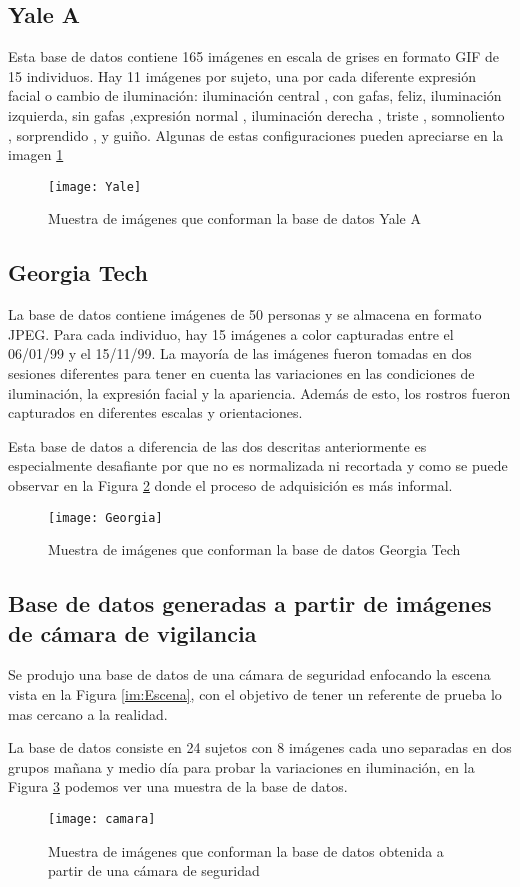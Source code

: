 \subsection{Yale A}
Esta base de datos\cite{Yale} contiene 165 imágenes en escala de grises en formato GIF de 15 individuos. Hay 11 imágenes por sujeto, una por cada diferente expresión facial o cambio de iluminación: iluminación central , con gafas, feliz, iluminación izquierda, sin gafas ,expresión normal , iluminación derecha , triste , somnoliento , sorprendido , y guiño. Algunas de estas configuraciones pueden apreciarse en la imagen \ref{Yale}
\begin{figure}[h]
	\center
	\texttt{[image: Yale]}
    \caption{Muestra de imágenes que conforman la base de datos Yale A}
    \label{Yale}
\end{figure}
\subsection{Georgia Tech}
La base de datos\cite{Georgia} contiene imágenes de 50 personas y se almacena en formato JPEG. Para cada individuo, hay 15 imágenes a color capturadas entre el 06/01/99 y el 15/11/99. La mayoría de las imágenes fueron tomadas en dos sesiones diferentes para tener en cuenta las variaciones en las condiciones de iluminación, la expresión facial y la apariencia. Además de esto, los rostros fueron capturados en diferentes escalas y orientaciones.

Esta base de datos a diferencia de las dos descritas anteriormente es especialmente desafiante por que no es normalizada ni recortada y como se puede observar en la Figura \ref{Georgia} donde el proceso de adquisición es más informal.
\begin{figure}[h]
	\centering
	\texttt{[image: Georgia]}
    \caption{Muestra de imágenes que conforman la base de datos Georgia Tech}
    \label{Georgia}
\end{figure}
\subsection{Base de datos generadas a partir de imágenes de cámara de vigilancia}
\label{scc:BDCamara}
Se produjo una base de datos de una cámara de seguridad enfocando la escena vista en la Figura \ref{im:Escena}, con el objetivo de tener un referente de prueba lo mas cercano a la realidad.

La base de datos consiste en 24 sujetos con 8 imágenes cada uno separadas en dos grupos mañana y medio día para probar la variaciones en iluminación, en la Figura \ref{camara} podemos ver una muestra de la base de datos.
\begin{figure}[h]
	\centering
	\texttt{[image: camara]}
    \caption{Muestra de imágenes que conforman la base de datos obtenida a partir de una cámara de seguridad}
    \label{camara}
\end{figure}

